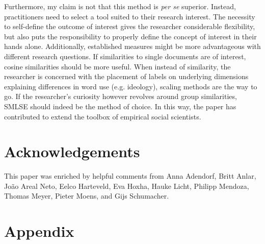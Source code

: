 \documentclass{article}
\begin{document}
Furthermore, my claim is not that this method is \textit{per se} superior. Instead, practitioners need to select a tool suited to their research interest. The necessity to self-define the outcome of interest gives the researcher considerable flexibility, but also puts the responsibility to properly define the concept of interest in their hands alone. Additionally, established measures might be more advantageous with different research questions. If similarities to single documents are of interest, cosine similarities should be more useful. When instead of similarity, the researcher is concerned with the placement of labels on underlying dimensions explaining differences in word use (e.g. ideology), scaling methods are the way to go. If the researcher's curiosity however revolves around group similarities, SMLSE should indeed be the method of choice. In this way, the paper has contributed to extend the toolbox of empirical social scientists. \par



\section*{Acknowledgements}
This paper was enriched by helpful comments from Anna Adendorf, Britt Anlar, João Areal Neto, Eelco Harteveld, Eva Hoxha, Hauke Licht, Philipp Mendoza, Thomas Meyer, Pieter Moens, and Gijs Schumacher.


\printbibliography

\newpage

\section*{Appendix}


\end{document}

